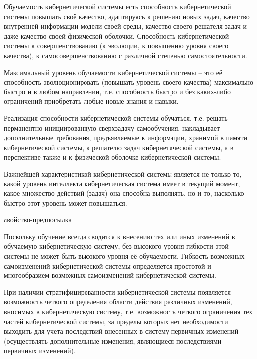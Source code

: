 Обучаемость кибернетической системы есть способность кибернетической системы повышать своё качество, адаптируясь к решению новых задач, качество внутренней информации модели своей среды, качество своего решателя задач и даже качество своей физической оболочки. 
Способность кибернетической системы к совершенствованию (к эволюции, к повышению уровня своего качества), к самосовершенствованию с различной степенью самостоятельности.

Максимальный уровень обучаемости кибернетической системы – это её способность эволюционировать (повышать уровень своего качества) максимально быстро и в любом направлении, т.е. способность быстро и без каких-либо ограничений приобретать любые новые знания и навыки.

Реализация способности кибернетической системы обучаться, т.е. решать перманентно инициированную сверхзадачу самообучения, накладывает дополнительные требования, предъявляемые к информации, хранимой в памяти кибернетической системы, к решателю задач кибернетической системы, а в перспективе также и к физической оболочке кибернетической системы.

Важнейшей характеристикой кибернетической системы является не только то, какой уровень интеллекта кибернетическая система имеет в текущий момент, какое множество действий (задач) она способна выполнять, но и то, насколько быстро этот уровень может повышаться.

\begin{SCn}
\begin{scnrelfromlist}{cвойство-предпосылка}
\end{scnrelfromlist}
\end{SCn}

Поскольку обучение всегда сводится к внесению тех или иных изменений в обучаемую кибернетическую систему, без высокого уровня гибкости этой системы не может быть высокого уровня её обучаемости.
Гибкость возможных самоизменений кибернетической системы определяется простотой и многообразием возможных самоизменений кибернетической системы.

При наличии стратифицированности кибернетической системы появляется возможность четкого определения области действия различных изменений, вносимых в кибернетическую систему, т.е. возможность четкого ограничения тех частей кибернетической системы, за пределы которых нет необходимости выходить для учета последствий внесенных в систему первичных изменений (осуществлять дополнительные изменения, являющиеся последствиями первичных изменений).

